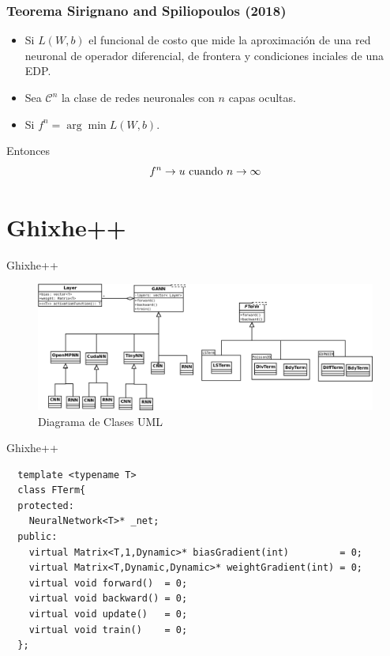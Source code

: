 \documentclass[aspectratio=1610]{beamer}
\begin{document}
\begin{frame}
  \frametitle{ Teorema Sirignano and Spiliopoulos (2018)}
  \begin{itemize}
  \item Si $L(W,b)$ el funcional de costo que mide la aproximaci\'on de una red neuronal  de operador diferencial, de frontera y condiciones inciales de una EDP.
  \item Sea $\mathcal{C}^n$ la clase de redes neuronales con $n$ capas ocultas.
  \item Si $f^n = \arg \min L(W,b)$. 
  \end{itemize}
Entonces
\begin{displaymath}
  f^n \to u \textnormal{ cuando } n \to \infty
\end{displaymath}

\end{frame}


\section{Ghixhe++}
\label{sec:i}

\begin{frame}{Ghixhe++}
    \begin{figure}[h]
    \centering
    \includegraphics[scale=0.3]{UML}
    \caption{ Diagrama de Clases UML }
  \end{figure}

\end{frame}


\begin{frame}[fragile]{Ghixhe++}
\begin{verbatim}
  template <typename T>
  class FTerm{
  protected:
    NeuralNetwork<T>* _net;
  public:
    virtual Matrix<T,1,Dynamic>* biasGradient(int)         = 0;
    virtual Matrix<T,Dynamic,Dynamic>* weightGradient(int) = 0;    
    virtual void forward()  = 0;
    virtual void backward() = 0;
    virtual void update()   = 0;
    virtual void train()    = 0;
  };

\end{verbatim}
\end{frame}
\end{document}
